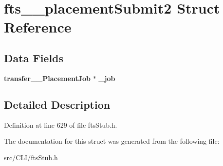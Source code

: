 \section{fts\_\-\_\-placementSubmit2 Struct Reference}
\label{structfts____placementSubmit2}
\subsection*{Data Fields}
\begin{DoxyCompactItemize}
\item 
{\bf transfer\_\-\_\-PlacementJob} $\ast$ {\bfseries \_\-job}\label{structfts____placementSubmit2_a32fe65444ed64b76fbad852b19e0fb39}

\end{DoxyCompactItemize}


\subsection{Detailed Description}


Definition at line 629 of file ftsStub.h.



The documentation for this struct was generated from the following file:\begin{DoxyCompactItemize}
\item 
src/CLI/ftsStub.h\end{DoxyCompactItemize}
